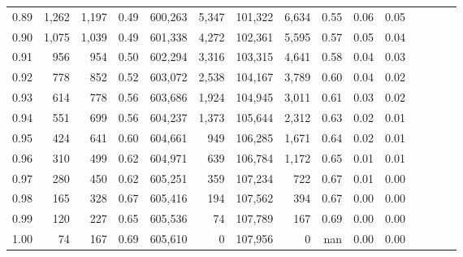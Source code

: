 \begin{tabular}{rrrcrrrrrrrrrrr}
0.89 &   1,262 &  1,197 &                                       0.49 &  600,263 &    5,347 &  101,322 &    6,634 &  0.55 &  0.06 &                         0.05 \\
0.90 &   1,075 &  1,039 &                                       0.49 &  601,338 &    4,272 &  102,361 &    5,595 &  0.57 &  0.05 &                         0.04 \\
0.91 &     956 &    954 &                                       0.50 &  602,294 &    3,316 &  103,315 &    4,641 &  0.58 &  0.04 &                         0.03 \\
0.92 &     778 &    852 &                                       0.52 &  603,072 &    2,538 &  104,167 &    3,789 &  0.60 &  0.04 &                         0.02 \\
0.93 &     614 &    778 &                                       0.56 &  603,686 &    1,924 &  104,945 &    3,011 &  0.61 &  0.03 &                         0.02 \\
0.94 &     551 &    699 &                                       0.56 &  604,237 &    1,373 &  105,644 &    2,312 &  0.63 &  0.02 &                         0.01 \\
0.95 &     424 &    641 &                                       0.60 &  604,661 &      949 &  106,285 &    1,671 &  0.64 &  0.02 &                         0.01 \\
0.96 &     310 &    499 &                                       0.62 &  604,971 &      639 &  106,784 &    1,172 &  0.65 &  0.01 &                         0.01 \\
0.97 &     280 &    450 &                                       0.62 &  605,251 &      359 &  107,234 &      722 &  0.67 &  0.01 &                         0.00 \\
0.98 &     165 &    328 &                                       0.67 &  605,416 &      194 &  107,562 &      394 &  0.67 &  0.00 &                         0.00 \\
0.99 &     120 &    227 &                                       0.65 &  605,536 &       74 &  107,789 &      167 &  0.69 &  0.00 &                         0.00 \\
1.00 &      74 &    167 &                                       0.69 &  605,610 &        0 &  107,956 &        0 &   nan &  0.00 &                         0.00 \\
\bottomrule
\end{tabular}
